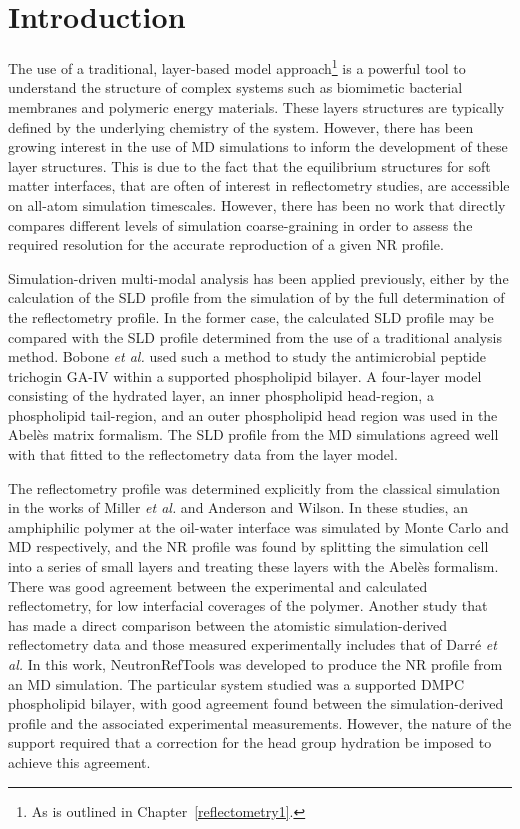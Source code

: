 \section{Introduction}
The use of a traditional, layer-based model approach\footnote{As is outlined in Chapter~\ref{reflectometry1}.} is a powerful tool to understand the structure of complex systems such as biomimetic bacterial membranes\autocite{barker_neutron_2016} and polymeric energy materials.\autocite{khodakarimi_x-ray_2016}
These layers structures are typically defined by the underlying chemistry of the system.
However, there has been growing interest in the use of MD simulations to inform the development of these layer structures.
This is due to the fact that the equilibrium structures for soft matter interfaces, that are often of interest in reflectometry studies, are accessible on all-atom simulation timescales.\autocite{scoppola_combining_2018}
However, there has been no work that directly compares different levels of simulation coarse-graining in order to assess the required resolution for the accurate reproduction of a given NR profile.

Simulation-driven multi-modal analysis has been applied previously, either by the calculation of the SLD profile from the simulation of by the full determination of the reflectometry profile.
In the former case, the calculated SLD profile may be compared with the SLD profile determined from the use of a traditional analysis method.
Bobone \emph{et al.} used such a method to study the antimicrobial peptide trichogin GA-IV within a supported phospholipid bilayer.\autocite{bobone_membrane_2013}
A four-layer model consisting of the hydrated  layer, an inner phospholipid head-region, a phospholipid tail-region, and an outer phospholipid head region was used in the Abel\`{e}s matrix formalism.
The SLD profile from the MD simulations agreed well with that fitted to the reflectometry data from the layer model.

The reflectometry profile was determined explicitly from the classical simulation in the works of Miller \emph{et al.} and Anderson and Wilson.\autocite{miller_monte_2003,anderson_molecular_2004}
In these studies, an amphiphilic polymer at the oil-water interface was simulated by Monte Carlo and MD respectively, and the NR profile was found by splitting the simulation cell into a series of small layers and treating these layers with the Abel\`{e}s formalism.
There was good agreement between the experimental and calculated reflectometry, for low interfacial coverages of the polymer.
Another study that has made a direct comparison between the atomistic simulation-derived reflectometry data and those measured experimentally includes that of Darr\'{e} \emph{et al.}\autocite{darre_molecular_2015}
In this work, NeutronRefTools was developed to produce the NR profile from an MD simulation.
The particular system studied was a supported DMPC phospholipid bilayer, with good agreement found between the simulation-derived profile and the associated experimental measurements.
However, the nature of the support required that a correction for the head group hydration be imposed to achieve this agreement.

